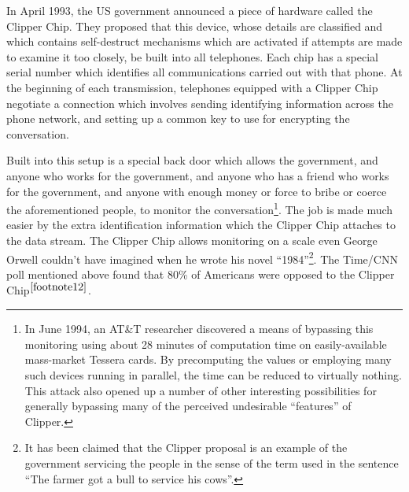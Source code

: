 In April 1993, the US government announced a piece of hardware called the
Clipper Chip.  They proposed that this device, whose details are classified and
which contains self-destruct mechanisms which are activated if attempts are
made to examine it too closely, be built into all telephones.  Each chip has a
special serial number which identifies all communications carried out with that
phone.  At the beginning of each transmission, telephones equipped with a
Clipper Chip negotiate a connection which involves sending identifying
information across the phone network, and setting up a common key to use for
encrypting the conversation.

Built into this setup is a special back door which allows the government, and
anyone who works for the government, and anyone who has a friend who works for
the government, and anyone with enough money or force to bribe or coerce the
aforementioned people, to monitor the conversation\footnote{
                In June 1994, an AT\&T researcher discovered a means of bypassing
                this monitoring using about 28 minutes of computation time on
                easily-available mass-market Tessera cards.  By precomputing the
                values or employing many such devices running in parallel, the
                time can be reduced to virtually nothing.  This attack also
                opened up a number of other interesting possibilities for
                generally bypassing many of the perceived undesirable ``features''
                of Clipper.
}.  The job is made much
easier by the extra identification information which the Clipper Chip attaches
to the data stream.  The Clipper Chip allows monitoring on a scale even George
Orwell couldn't have imagined when he wrote his novel ``1984''\footnote{
              It has been claimed that the Clipper proposal is an example of
              the government servicing the people in the sense of the term
              used in the sentence ``The farmer got a bull to service his
              cows''.
}.  The Time/CNN
poll mentioned above found that 80\% of Americans were opposed to the Clipper
Chip$^{\ref{footnote12}}$.


